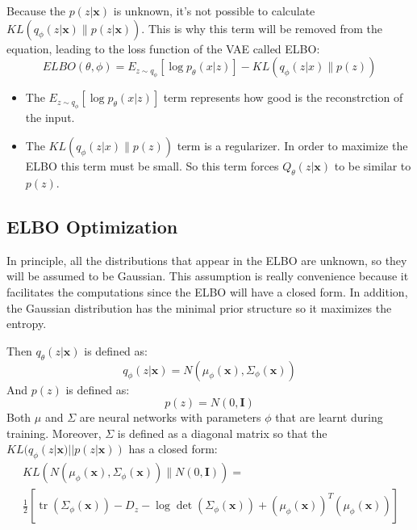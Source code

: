 \documentclass[5p,sort&compress]{elsarticle}
\begin{document}
Because the $p(z|\boldsymbol{x})$ is unknown, it's not possible to calculate $K L\left(q_{\phi}(z | \boldsymbol{x}) \| p(z | \boldsymbol{x})\right)$. This is why this term will be removed from the equation, leading to the loss function of the VAE called ELBO:
\begin{equation}
ELBO(\theta, \phi)=E_{z \sim q_{\phi}}\left[\log p_{\theta}(x | z)\right]-K L\left(q_{\phi}(z | x) \| p(z)\right)
\end{equation}

\begin{itemize}
    \item The $E_{z \sim q_{\phi}}\left[\log p_{\theta}(x | z)\right]$ term represents how good is the reconstrction of the input.
    \item The $K L\left(q_{\phi}(z | x) \| p(z)\right)$ term is a regularizer. In order to maximize the ELBO this term must be small. So this term forces $Q_{\theta}(z|\boldsymbol{x})$ to be similar to $p(z)$.
\end{itemize}


\subsection{ELBO Optimization}

In principle, all the distributions that appear in the ELBO are unknown, so they will be assumed to be Gaussian. This assumption is really convenience because it facilitates the computations since the ELBO will have a closed form. In addition, the Gaussian distribution has the minimal prior structure so it maximizes the entropy.

Then $q_{\theta}(z|\boldsymbol{x})$ is defined as:
\begin{equation}
q_{\phi}(z | \boldsymbol{x})=N\left(\mu_{\phi}(\boldsymbol{x}), \Sigma_{\phi}(\boldsymbol{x})\right)
\end{equation}
And $p(z)$ is defined as:
\begin{equation}
p(z)=N(0, \boldsymbol{I})
\end{equation}
Both $\mu$ and $\Sigma$ are neural networks with parameters $\phi$ that are learnt during training. Moreover, $\Sigma$ is defined as a diagonal matrix so that the $KL(q_{\phi}(z|\boldsymbol{x})||p(z|\boldsymbol{x}))$ has a closed form:
\begin{equation}\
\begin{aligned}
K L\left(N\left(\mu_{\phi}(\boldsymbol{x}), \Sigma_{\phi}(\boldsymbol{x})\right) \| N(0, \boldsymbol{I})\right)= \\ \frac{1}{2}\left[\operatorname{tr}\left(\Sigma_{\phi}(\boldsymbol{x})\right)-D_{z}-\log \operatorname{det}\left(\Sigma_{\phi}(\boldsymbol{x})\right)+\left(\mu_{\phi}(\boldsymbol{x})\right)^{T}\left(\mu_{\phi}(\boldsymbol{x})\right)\right]
\end{aligned}
\end{equation}
\end{document}
